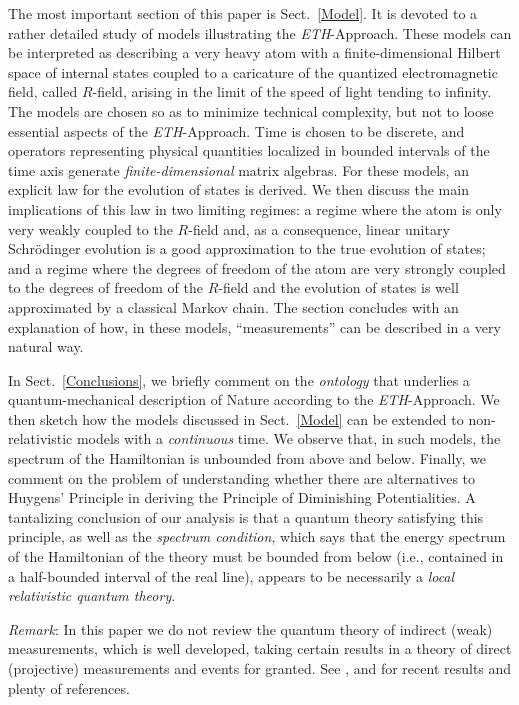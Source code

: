 \documentclass[12pt]{article}
\begin{document}
The most important section of this paper is Sect.~\ref{Model}. It is devoted to a rather detailed study of models illustrating
the \textit{ETH}-Approach. These models can be interpreted as describing a very heavy atom with a finite-dimensional
Hilbert space of internal states coupled to a caricature of the quantized electromagnetic field, called $R$-field,
arising in the limit of the speed of light tending to infinity. The models are chosen so as to minimize technical
complexity, but not to loose essential aspects of the \textit{ETH}-Approach. Time is chosen to be discrete,
and operators representing physical quantities localized in bounded intervals of the time axis generate
\textit{finite-dimensional} matrix algebras. For these models, an explicit law for the evolution of states is
derived. We then discuss the main implications of this law in two limiting regimes: a regime where the atom is only
very weakly coupled to the $R$-field and, as a consequence, linear unitary Schr\"odinger evolution is a good approximation
to the true evolution of states; and a regime where the degrees of freedom of the atom are very strongly coupled to the
degrees of freedom of the $R$-field and the evolution of states is well approximated by a classical Markov chain.
The section concludes with an explanation of how, in these models, ``measurements'' can be described in a very
natural way.

In Sect.~\ref{Conclusions}, we briefly comment on the \textit{ontology} that underlies a quantum-mechanical description
of Nature according to the \textit{ETH}-Approach. We then sketch how the models discussed in Sect.~\ref{Model} can be
extended to non-relativistic models with a \textit{continuous} time. We observe that, in such models, the spectrum
of the Hamiltonian is unbounded from above and below. Finally, we comment on the problem of understanding
whether there are alternatives to Huygens' Principle in deriving the Principle of Diminishing Potentialities.
A tantalizing conclusion of our analysis is that a quantum theory satisfying this principle, as well as the
\textit{spectrum condition}, which says that the energy spectrum of the Hamiltonian of the theory must be
bounded from below (i.e., contained in a half-bounded interval of the real line), appears to be necessarily a
\textit{local relativistic quantum theory}.

\textit{Remark}: In this paper we do not review the quantum theory of indirect (weak) measurements, which is well developed,
taking certain results in a theory of direct (projective) measurements and events for granted.
See \cite{M-K}, and \cite{BCJP} for recent  results and plenty of references.
\end{document}
